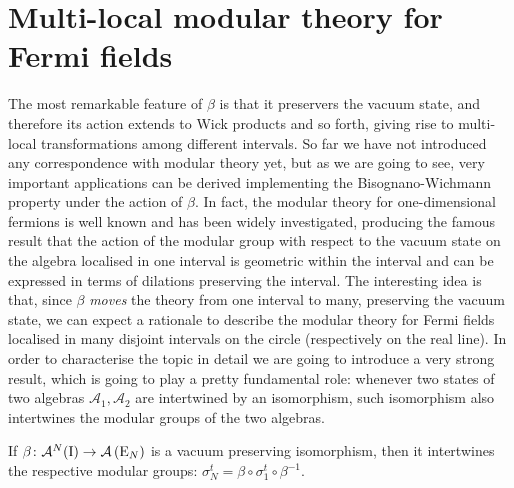 \section{Multi-local modular theory for Fermi fields}
The most remarkable feature of $\beta$ is that it 
preservers the vacuum state, and therefore its action 
extends to Wick products and so forth, giving rise to 
multi-local transformations among different intervals. 
So far we have not introduced any correspondence with 
modular theory yet, but as we are going to see, very 
important applications can be derived implementing the 
Bisognano-Wichmann property under the action of $\beta$. 
In fact, the modular theory for one-dimensional fermions
is well known and has been widely investigated,
producing the famous result that the action of the 
modular group with respect to the vacuum state 
on the algebra localised in one interval is geometric
within the interval and can be expressed in terms of 
dilations preserving the interval. The interesting idea is that, 
since $\beta$ \emph{moves}
the theory from one interval to many, preserving the 
vacuum state, we can expect a rationale to describe 
the modular theory for Fermi fields localised in many 
disjoint intervals on the circle (respectively on 
the real line). In order to characterise the topic 
in detail we are going to introduce a very strong result,
which is going to play a pretty fundamental role: whenever
two states of two algebras $\mathcal{A}_1,\mathcal{A}_2$ 
are intertwined by an isomorphism, such 
isomorphism also intertwines the modular groups of the two algebras.
\begin{theorem}
If $\beta\colon\mathcal{A}^N(\textrm{I})\to\mathcal{A}\left(\textrm{E}_N\right)$
is a vacuum preserving isomorphism, then it intertwines
the respective modular groups:
$\sigma_N^t=\beta\circ\sigma_1^t\circ\beta^{-1}$.
\end{theorem}
